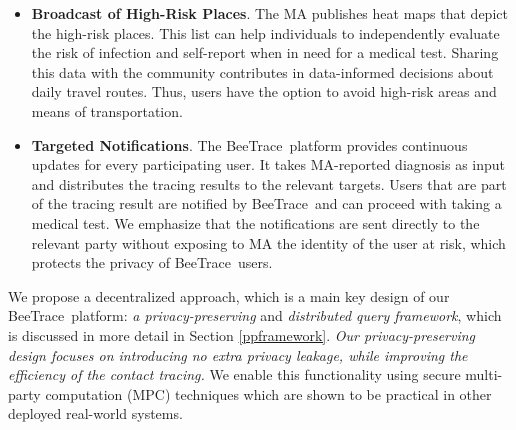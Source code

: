 \documentclass[11pt,dvipdfmx]{article}  %
\newcommand{\sysname}{\textsf{BeeTrace}\xspace}
\begin{document}

\begin{itemize}
    \item \textbf{Broadcast of High-Risk Places}. The MA publishes heat maps that depict the high-risk places. %
    This list can help individuals to independently evaluate the risk of infection and self-report when in need for a medical test. Sharing this data with the community contributes in data-informed decisions about daily travel routes. Thus, users have the option to avoid high-risk areas and means of transportation. 
    \item \textbf{Targeted Notifications}. The \sysname\ platform provides continuous updates for every participating user. It takes MA-reported diagnosis as input and distributes the tracing results to the relevant targets. Users that are part of the tracing result are notified by \sysname\ and can proceed with taking a medical test. We emphasize that the notifications are sent directly to the relevant party without exposing to MA the identity of the user at risk, which protects the privacy of \sysname\ users.
\end{itemize}

We propose a decentralized approach, which is a main key design of our \sysname\ platform: \emph{a privacy-preserving} and \emph{distributed query framework}, which is discussed in more detail in Section \ref{ppframework}. 
\emph{Our privacy-preserving design focuses on introducing no extra privacy leakage, while improving the efficiency of the contact tracing.} 
We enable this functionality using secure multi-party computation (MPC) techniques which are shown to be practical in other deployed real-world systems.
\end{document}
